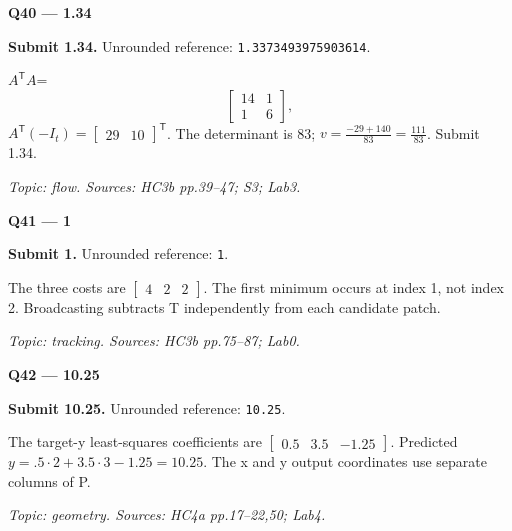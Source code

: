 \documentclass[11pt,a4paper]{article}
\begin{document}
\begin{minipage}{\linewidth}
\textbf{Q40 — 1.34}\par\smallskip
\textbf{Submit 1.34.} Unrounded reference: \texttt{1.3373493975903614}.\par
\(A^{\mathsf T}A\)=\allowbreak{}
\[\begin{bmatrix}14&1\\1&6\end{bmatrix},\]
 \(A^{\mathsf T}(-I_t)=\begin{bmatrix}29&10\end{bmatrix}^{\mathsf T}\). The determinant is 83; \(v=\frac{-29+140}{83}=\frac{111}{83}\). Submit 1.34.\par
{\small\itshape Topic: flow. Sources: HC3b pp.39–47; S3; Lab3.}

\end{minipage}
\par\vspace{12pt}
\begin{minipage}{\linewidth}
\textbf{Q41 — 1}\par\smallskip
\textbf{Submit 1.} Unrounded reference: \texttt{1}.\par
The three costs are \(\begin{bmatrix}4&2&2\end{bmatrix}\). The first minimum occurs at index 1,\allowbreak{} not index 2. Broadcasting subtracts T independently from each candidate patch.\par
{\small\itshape Topic: tracking. Sources: HC3b pp.75–87; Lab0.}

\end{minipage}
\par\vspace{12pt}
\begin{minipage}{\linewidth}
\textbf{Q42 — 10.25}\par\smallskip
\textbf{Submit 10.25.} Unrounded reference: \texttt{10.25}.\par
The target-y least-squares coefficients are \(\begin{bmatrix}0.5&3.5&-1.25\end{bmatrix}\). Predicted \(y=.5\cdot2+3.5\cdot3-1.25=10.25\). The x and y output coordinates use separate columns of P.\par
{\small\itshape Topic: geometry. Sources: HC4a pp.17–22,\allowbreak{}50; Lab4.}

\end{minipage}
\par\vspace{12pt}
\end{document}
